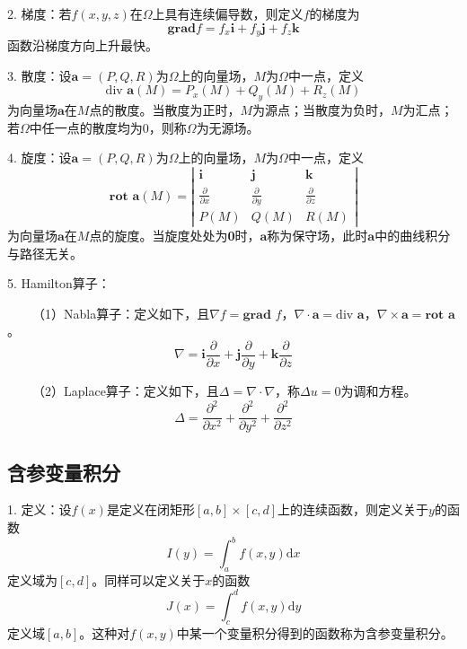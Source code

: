 2. 梯度：若$f(x,y,z)$在$\Omega$上具有连续偏导数，则定义$f$的梯度为
\begin{equation*}
    \mathbf{grad} f=f_x \mathbf{i}+f_y \mathbf{j}+f_z\mathbf{k}
\end{equation*}
函数沿梯度方向上升最快。

3. 散度：设$\mathbf{a}=(P,Q,R)$为$\Omega$上的向量场，$M$为$\Omega$中一点，定义
\begin{equation*}
    \text{div } \mathbf{a}(M)=P_x(M)+Q_y(M)+R_z(M)
\end{equation*}
为向量场$\mathbf{a}$在$M$点的散度。当散度为正时，$M$为源点；当散度为负时，$M$为汇点；若$\Omega$中任一点的散度均为0，则称$\Omega$为无源场。

4. 旋度：设$\mathbf{a}=(P,Q,R)$为$\Omega$上的向量场，$M$为$\Omega$中一点，定义
\begin{equation*}
    \textbf{rot } \mathbf{a}(M)=\left|\begin{matrix}
        \mathbf{i} &\mathbf{j}&\mathbf{k}\\
        \frac{\partial }{\partial x} &\frac{\partial }{\partial y}&\frac{\partial }{\partial z}\\
        P(M)&Q(M)&R(M)  
    \end{matrix}\right|
\end{equation*}
为向量场$\mathbf{a}$在$M$点的旋度。当旋度处处为\textbf{0}时，$\textbf{a}$称为保守场，此时$\textbf{a}$中的曲线积分与路径无关。

5. Hamilton算子：

~~~~（1）Nabla算子：定义如下，且$\nabla f=\textbf{grad }f $，$\nabla \cdot \mathbf{a}=\text{div }\mathbf{a} $，$\nabla \times \mathbf{a}=\textbf{rot }\mathbf{a} $。
\begin{equation*}
    \nabla = \mathbf{i}\frac{\partial }{\partial x}+\mathbf{j}\frac{\partial }{\partial y}+\mathbf{k}\frac{\partial }{\partial z}
\end{equation*}

~~~~（2）Laplace算子：定义如下，且$\Delta=\nabla \cdot \nabla$，称$\Delta u=0$为调和方程。
\begin{equation*}
    \Delta = \frac{\partial^2}{\partial x^2}+\frac{\partial^2}{\partial y^2}+\frac{\partial^2}{\partial z^2}
\end{equation*}

\subsection{含参变量积分}

1. 定义：设$f(x)$是定义在闭矩形$[a,b]\times [c,d]$上的连续函数，则定义关于$y$的函数
\begin{equation*}
    I(y)=\int_a^b f(x,y)\mathrm{d}x
\end{equation*}
定义域为$[c,d]$。同样可以定义关于$x$的函数
\begin{equation*}
    J(x)=\int_c^d f(x,y)\mathrm{d}y
\end{equation*}
定义域$[a,b]$。这种对$f(x,y)$中某一个变量积分得到的函数称为含参变量积分。

